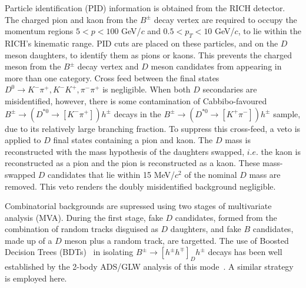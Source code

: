 \documentclass[oneside,12pt]{article}
\begin{document}
Particle identification (PID) information is obtained from the RICH detector.
The charged pion and kaon from the $B^{\pm}$ decay vertex are required to occupy
the momentum regions $5 < p < 100$ GeV/$c$ and $0.5 < p_T < 10$ GeV/$c$, to lie
within the RICH's kinematic range. PID cuts are placed on these particles, and
on the $D$ meson daughters, to identify them as pions or kaons. This prevents
the charged meson from the $B^{\pm}$ decay vertex and $D$ meson candidates from
appearing in more than one category. Cross feed between the final states
$D^{0}\rightarrow K^-\pi^+, K^-K^+, \pi^-\pi^+$ is negligible. When both $D$
secondaries are misidentified, however, there is some contamination of
Cabbibo-favoured $B^{\pm}\rightarrow (D^{*0}\rightarrow [K^-\pi^+])h^{\pm}$
decays in the $B^{\pm}\rightarrow (D^{*0}\rightarrow [K^+\pi^-])h^{\pm}$ sample,
due to its relatively large branching fraction. To suppress this cross-feed, a
veto is applied to $D$ final states containing a pion and kaon.  The $D$ mass is
reconstructed with the mass hypothesis of the daughters swapped, $i.e.$ the kaon
is reconstructed as a pion and the pion is reconstructed as a kaon. These
mass-swapped $D$ candidates that lie within 15 MeV/$c^2$ of the nominal $D$ mass
are removed. This veto renders the doubly misidentified background negligible.

Combinatorial backgrounds are supressed using two stages of multivariate
analysis (MVA). During the first stage, fake $D$ candidates, formed from the
combination of random tracks disguised as $D$ daughters, and fake $B$
candidates, made up of a $D$ meson plus a random track, are targetted.  The
use of Boosted Decision Trees (BDTs)~\cite{RegressionTrees} in isolating
$B^{\pm}\rightarrow [h^{\pm}h^{\mp}]_{D}h^{\pm}$ decays has been well
established by the 2-body ADS/GLW analysis of this mode~\cite{B2DKD2hh}. A
similar strategy is employed here. 
\end{document}
